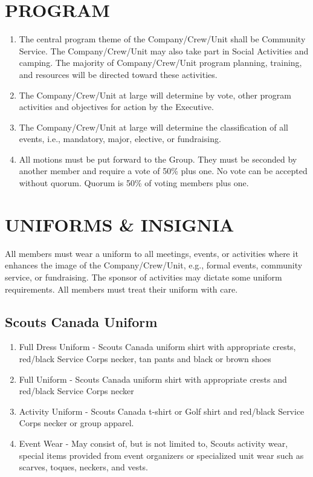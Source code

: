 \documentclass{Service_Corps_Document}
\begin{document}
    \section{PROGRAM}\label{sec:program}
    \begin{enumerate}
        \item The central program theme of the Company/Crew/Unit shall be Community Service.
        The Company/Crew/Unit may also take part in Social Activities and camping.
        The majority of Company/Crew/Unit program planning, training, and resources will be directed toward these activities.
        \item The Company/Crew/Unit at large will determine by vote, other program activities and objectives for action by the Executive.
        \item The Company/Crew/Unit at large will determine the classification of all events, i.e., mandatory, major, elective, or fundraising.
        \item All motions must be put forward to the Group.
        They must be seconded by another member and require a vote of 50\% plus one.
        No vote can be accepted without quorum.
        Quorum is 50\% of voting members plus one.
    \end{enumerate}


    \section{UNIFORMS \& INSIGNIA}\label{sec:uniforms-&-insignia}
    All members must wear a uniform to all meetings, events, or activities where it enhances the image of the Company/Crew/Unit, e.g., formal events, community service, or fundraising.
    The sponsor of activities may dictate some uniform requirements.
    All members must treat their uniform with care.

    \subsection{Scouts Canada Uniform}\label{subsec:scouts-canada-uniform}
    \begin{enumerate}
        \item Full Dress Uniform - Scouts Canada uniform shirt with appropriate crests, red/black Service Corps necker, tan pants and black or brown shoes
        \item Full Uniform - Scouts Canada uniform shirt with appropriate crests and red/black Service Corps necker
        \item Activity Uniform - Scouts Canada t-shirt or Golf shirt and red/black Service Corps necker or group apparel.
        \item Event Wear - May consist of, but is not limited to, Scouts activity wear, special items provided from event organizers or specialized unit wear such as scarves, toques, neckers, and vests.
    \end{enumerate}
\end{document}
